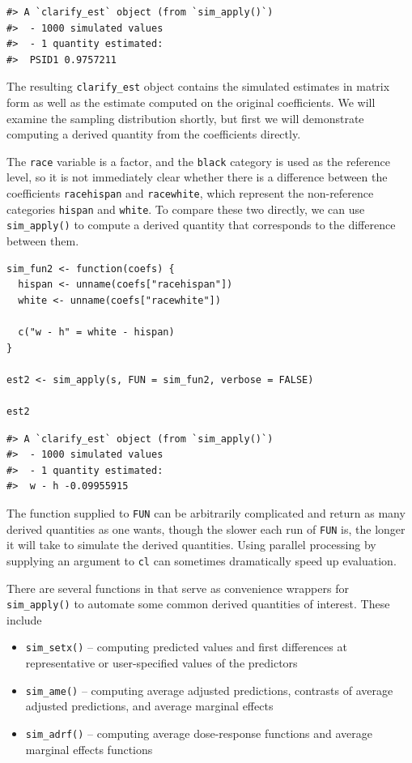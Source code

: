 \begin{verbatim}
#> A `clarify_est` object (from `sim_apply()`)
#>  - 1000 simulated values
#>  - 1 quantity estimated:                
#>  PSID1 0.9757211
\end{verbatim}

The resulting \texttt{clarify\_est} object contains the simulated estimates in matrix form as well as the estimate computed on the original coefficients. We will examine the sampling distribution shortly, but first we will demonstrate computing a derived quantity from the coefficients directly.

The \texttt{race} variable is a factor, and the \texttt{black} category is used as the reference level, so it is not immediately clear whether there is a difference between the coefficients \texttt{racehispan} and \texttt{racewhite}, which represent the non-reference categories \texttt{hispan} and \texttt{white}. To compare these two directly, we can use \texttt{sim\_apply()} to compute a derived quantity that corresponds to the difference between them.

\begin{verbatim}
sim_fun2 <- function(coefs) {
  hispan <- unname(coefs["racehispan"])
  white <- unname(coefs["racewhite"])
  
  c("w - h" = white - hispan)
}

est2 <- sim_apply(s, FUN = sim_fun2, verbose = FALSE)

est2
\end{verbatim}

\begin{verbatim}
#> A `clarify_est` object (from `sim_apply()`)
#>  - 1000 simulated values
#>  - 1 quantity estimated:                  
#>  w - h -0.09955915
\end{verbatim}

The function supplied to \texttt{FUN} can be arbitrarily complicated and return as many derived quantities as one wants, though the slower each run of \texttt{FUN} is, the longer it will take to simulate the derived quantities. Using parallel processing by supplying an argument to \texttt{cl} can sometimes dramatically speed up evaluation.

There are several functions in  that serve as convenience wrappers for \texttt{sim\_apply()} to automate some common derived quantities of interest. These include

\begin{itemize}
\item
  \texttt{sim\_setx()} -- computing predicted values and first differences at representative or user-specified values of the predictors
\item
  \texttt{sim\_ame()} -- computing average adjusted predictions, contrasts of average adjusted predictions, and average marginal effects
\item
  \texttt{sim\_adrf()} -- computing average dose-response functions and average marginal effects functions
\end{itemize}

